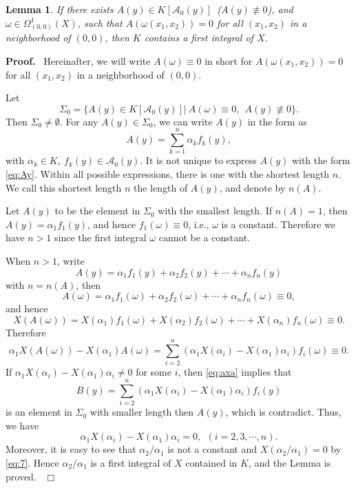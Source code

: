\documentclass[preprint, 12pt]{elsarticle}
\newtheorem{lem}[thm]{Lemma}
\numberwithin{equation}{section}
\newenvironment{proof}[1][Proof]{\textbf{#1.}\ }{\ $\Box$}
\newcommand{\A}{\mathcal{A}}
\begin{document}
\begin{lem}
\label{le:21} If there exists $A(y)\in K[\A_0(y)]$\
($A(y)\not\equiv 0$), and $\omega\in \Omega_{(0,0)}^1(X)$, such
that $A(\omega(x_1,x_2)) = 0$ for all $(x_1,x_2)$ in a neighborhood of $(0,0)$, then $K$ contains a first integral of $X$.
\end{lem}
\begin{proof}
Hereinafter, we will write $A(\omega) \equiv 0$ in short for $A(\omega(x_1,x_2)) = 0$ for all $(x_1,x_2)$ in a neighborhood of $(0,0)$. 

Let
$$\Sigma_0 = \{A(y)\in K[\A_0(y)]|\ A(\omega) \equiv 0,\ \ A(y)\not\equiv 0\}.$$
Then $\Sigma_0\not=\emptyset$. For any $A(y)\in \Sigma_0$, we can write $A(y)$ in the form as
\begin{equation}
\label{eq:Ay}
A(y) = \sum_{k=1}^n \alpha_k f_k(y),
\end{equation}
with $\alpha_k\in K,\ f_k(y)\in  \A_0(y)$. It is not unique to express $A(y)$ with the form \eqref{eq:Ay}.  Within all possible expressions, there is one with the shortest length $n$. We call this shortest length $n$ the length of $A(y)$, and denote by $n(A)$. 

Let $A(y)$ to be the element in $\Sigma_0$ with the
smallest length. If $n(A) =  1$, then $A(y) = \alpha_1 f_1(y)$, and hence
$f_1(\omega) \equiv 0$, i.e., $\omega$ is a constant. Therefore we have $n
> 1$ since the first integral $\omega$ cannot be a constant.

When $n > 1$, write
$$A(y) = \alpha_1 f_1(y) + \alpha_2 f_2(y) + \cdots + \alpha_n f_n(y)$$
with $n = n(A)$, then
$$A(\omega) = \alpha_1 f_1(\omega) + \alpha_2 f_2(\omega) + \cdots + \alpha_n f_n (\omega) \equiv 0,$$
and hence
$$X (A(\omega)) = X (\alpha_1) f_1(\omega)  + X(\alpha_2) f_2(\omega) + \cdots +
X(\alpha_n) f_n(\omega) \equiv 0.$$ Therefore
\begin{equation}
\label{eq:axa}
\alpha_1 X(A(\omega)) - X(\alpha_1) A(\omega) = \sum_{i = 2}^n
(\alpha_1 X(\alpha_i) - X(\alpha_1) \alpha_i) f_i(\omega) \equiv 0.
\end{equation}
If $\alpha_1 X(\alpha_i) - X(\alpha_1)\alpha_i\not=0$ for some $i$, then \eqref{eq:axa} implies that
$$B(y) = \sum_{i = 2}^n(\alpha_1 X(\alpha_i) - X(\alpha_1) \alpha_i) f_i(y)$$
is an element in $\Sigma_0$ with smaller length then 
$A(y)$, which is contradict. Thus, we have
\begin{equation}
\label{eq:7} \alpha_1 X(\alpha_i) - X(\alpha_1) \alpha_i = 0,\ \ (i=2,3,\cdots, n).
\end{equation}
Moreover, it is easy to see that $\alpha_2/\alpha_1$ is not a constant and $X(\alpha_2/\alpha_1) = 0$ by \eqref{eq:7}. Hence $\alpha_2/\alpha_1$ is a first integral of $X$ contained in $K$, and the Lemma is proved.
\end{proof}
\end{document}
